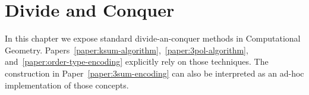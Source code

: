 \chapter{\done Divide and Conquer}

In this chapter we expose standard divide-an-conquer methods in
Computational Geometry.
%
Papers~\ref{paper:ksum-algorithm},~\ref{paper:3pol-algorithm},
and~\ref{paper:order-type-encoding} explicitly rely on those techniques.
%
The construction in
Paper~\ref{paper:3sum-encoding} can also be interpreted as an ad-hoc
implementation of those concepts.






